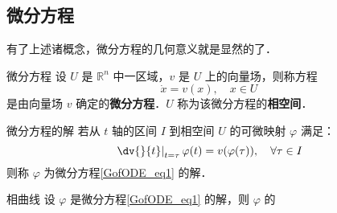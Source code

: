 \subsection{微分方程}
有了上述诸概念，微分方程的几何意义就是显然的了．
\begin{definition}{微分方程}
设 $U$ 是 $\mathbb R^n$ 中一区域，$v$ 是 $U$ 上的向量场，则称方程
\begin{equation}\label{GofODE_eq1}
\dot x=v(x),\quad x\in U
\end{equation}
是由向量场 $v$ 确定的\textbf{微分方程}．$U$ 称为该微分方程的\textbf{相空间}． 
\end{definition}

\begin{definition}{微分方程的解}
若从 $t$ 轴的区间 $I$ 到相空间 $U$ 的可微映射 $\varphi$ 满足：
\begin{equation}
\left.\dv{}{t}\right|_{t=\tau}\varphi(t)=v(\varphi(\tau)),\quad\forall\tau\in I
\end{equation}
则称 $\varphi$ 为微分方程\autoref{GofODE_eq1} 的解．
\end{definition}
\begin{definition}{相曲线}
设 $\varphi$ 是微分方程\autoref{GofODE_eq1} 的解，则 $\varphi$ 的
\end{definition}